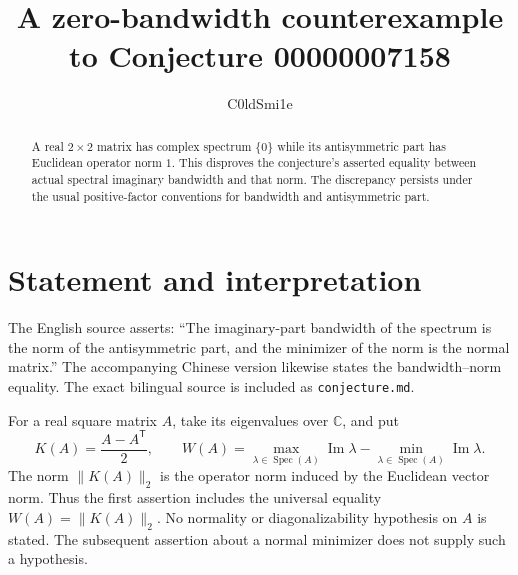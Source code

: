 \documentclass[11pt]{article}
\title{A zero-bandwidth counterexample to Conjecture 00000007158}
\author{C0ldSmi1e}
\date{}
\newcommand{\Spec}{\operatorname{Spec}}
\newcommand{\im}{\operatorname{Im}}
\begin{document}
\maketitle
\begin{abstract}
A real $2\times2$ matrix has complex spectrum $\{0\}$ while its
antisymmetric part has Euclidean operator norm $1$. This disproves the
conjecture's asserted equality between actual spectral imaginary bandwidth
and that norm. The discrepancy persists under the usual positive-factor
conventions for bandwidth and antisymmetric part.
\end{abstract}

\section{Statement and interpretation}
The English source asserts: ``The imaginary-part bandwidth of the spectrum
is the norm of the antisymmetric part, and the minimizer of the norm is the
normal matrix.'' The accompanying Chinese version likewise states the
bandwidth--norm equality. The exact bilingual source is included as
\texttt{conjecture.md}.

For a real square matrix $A$, take its eigenvalues over $\mathbb C$, and put
\[
 K(A)=\frac{A-A^{\mathsf T}}2,
 \qquad
 W(A)=\max_{\lambda\in\Spec(A)}\im\lambda
       -\min_{\lambda\in\Spec(A)}\im\lambda.
\]
The norm $\|K(A)\|_2$ is the operator norm induced by the Euclidean vector
norm. Thus the first assertion includes the universal equality
$W(A)=\|K(A)\|_2$. No normality or diagonalizability hypothesis on $A$ is
stated. The subsequent assertion about a normal minimizer does not supply
such a hypothesis.
\end{document}
